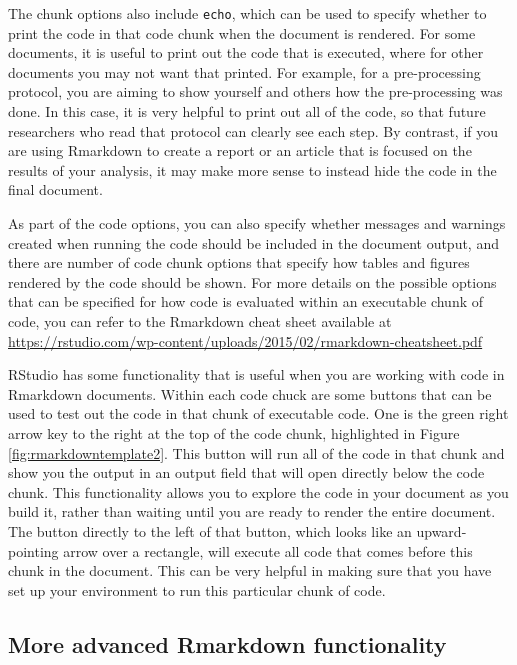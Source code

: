 \documentclass[]{tufte-book}
\begin{document}
The chunk options also include \texttt{echo}, which can be used to specify whether to
print the code in that code chunk when the document is rendered. For some
documents, it is useful to print out the code that is executed, where for other
documents you may not want that printed. For example, for a pre-processing
protocol, you are aiming to show yourself and others how the pre-processing was
done. In this case, it is very helpful to print out all of the code, so that
future researchers who read that protocol can clearly see each step. By
contrast, if you are using Rmarkdown to create a report or an article that is
focused on the results of your analysis, it may make more sense to instead hide
the code in the final document.

As part of the code options, you can also specify whether messages and warnings
created when running the code should be included in the document output, and
there are number of code chunk options that specify how tables and figures
rendered by the code should be shown. For more details on the possible options
that can be specified for how code is evaluated within an executable chunk of
code, you can refer to the Rmarkdown cheat sheet available at
\url{https://rstudio.com/wp-content/uploads/2015/02/rmarkdown-cheatsheet.pdf}

RStudio has some functionality that is useful when you are working with code in
Rmarkdown documents. Within each code chuck are some buttons that can be used to
test out the code in that chunk of executable code. One is the green right arrow
key to the right at the top of the code chunk, highlighted in Figure
\ref{fig:rmarkdowntemplate2}. This button will run all of the code in that
chunk and show you the output in an output field that will open directly below
the code chunk. This functionality allows you to explore the code in your
document as you build it, rather than waiting until you are ready to render the
entire document. The button directly to the left of that button, which looks
like an upward-pointing arrow over a rectangle, will execute all code that comes
before this chunk in the document. This can be very helpful in making sure that
you have set up your environment to run this particular chunk of code.

\subsection{More advanced Rmarkdown functionality}\label{more-advanced-rmarkdown-functionality}
\end{document}
